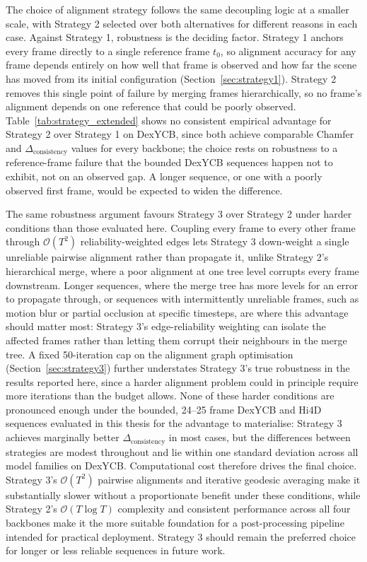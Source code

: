 The choice of alignment strategy follows the same decoupling logic at a smaller scale,
with Strategy 2 selected over both alternatives for different reasons in each case.
Against Strategy 1, robustness is the deciding factor. Strategy 1 anchors every frame
directly to a single reference frame $t_0$, so alignment accuracy for any frame depends
entirely on how well that frame is observed and how far the scene has moved from its
initial configuration (Section~\ref{sec:strategy1}). Strategy 2 removes this single
point of failure by merging frames hierarchically, so no frame's alignment depends on
one reference that could be poorly observed. Table~\ref{tab:strategy_extended} shows no
consistent empirical advantage for Strategy 2 over Strategy 1 on DexYCB, since both
achieve comparable Chamfer and $\Delta_{\text{consistency}}$ values for every backbone;
the choice rests on robustness to a reference-frame failure that the bounded DexYCB
sequences happen not to exhibit, not on an observed gap. A longer sequence, or one with
a poorly observed first frame, would be expected to widen the difference.

The same robustness argument favours Strategy 3 over Strategy 2 under harder
conditions than those evaluated here. Coupling every frame to every other frame through
$\mathcal{O}(T^2)$ reliability-weighted edges lets Strategy 3 down-weight a single
unreliable pairwise alignment rather than propagate it, unlike Strategy 2's hierarchical
merge, where a poor alignment at one tree level corrupts every frame downstream. Longer
sequences, where the merge tree has more levels for an error to propagate through, or
sequences with intermittently unreliable frames, such as motion blur or partial
occlusion at specific timesteps, are where this advantage should matter most: Strategy
3's edge-reliability weighting can isolate the affected frames rather than letting them
corrupt their neighbours in the merge tree. A fixed 50-iteration cap on the alignment
graph optimisation (Section~\ref{sec:strategy3}) further understates Strategy 3's true
robustness in the results reported here, since a harder alignment problem could in
principle require more iterations than the budget allows. None of these harder
conditions are pronounced enough under the bounded, 24--25 frame DexYCB and Hi4D
sequences evaluated in this thesis for the advantage to materialise: Strategy 3 achieves
marginally better $\Delta_{\text{consistency}}$ in most cases, but the differences
between strategies are modest throughout and lie within one standard deviation across
all model families on DexYCB. Computational cost therefore drives the final choice.
Strategy 3's $\mathcal{O}(T^2)$ pairwise alignments and iterative geodesic averaging make
it substantially slower without a proportionate benefit under these conditions, while
Strategy 2's $\mathcal{O}(T \log T)$ complexity and consistent performance across all
four backbones make it the more suitable foundation for a post-processing pipeline
intended for practical deployment. Strategy 3 should remain the preferred choice for
longer or less reliable sequences in future work.
